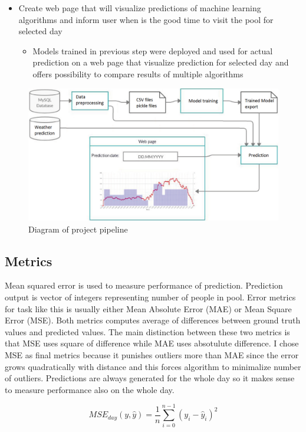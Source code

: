 \documentclass{article}
\begin{document}
\begin{itemize}
\item Create web page that will visualize predictions of machine learning algorithms and inform user when is the good time to visit the pool for selected day
\begin{itemize}
\item Models trained in previous step were deployed and used for actual prediction on a web page that visualize prediction for selected day and offers possibility to compare results of multiple algorithms
\end{itemize}
\end{itemize}

\begin{figure}[h!]
\centering
\includegraphics[width=12cm]{imgs/project_pipeline}
\caption{Diagram of project pipeline}
\label{fig:diagram_pipeline}
\end{figure}

\subsection{Metrics} \label{sec:metrics}
Mean squared error is used to measure performance of prediction. Prediction output is vector of integers representing number of people in pool. Error metrics for task like this is usually either Mean Absolute Error (MAE) or Mean Square Error (MSE). Both metrics computes average of differences between ground truth values and predicted values. The main distinction between these two metrics is that MSE uses square of difference while MAE uses absotulute difference. I chose MSE as final metrics because it punishes outliers more than MAE since the error grows quadratically with distance and this forces algorithm to minimalize number of outliers. Predictions are always generated for the whole day so it makes sense to measure performance also on the whole day. 

\begin{equation}
\label{eq:mse}
MSE_{day}(y,\hat{y}) = \dfrac{1}{n} \sum^{n-1}_{i=0}(y_i-\hat{y}_i)^2
\end{equation}
\end{document}
